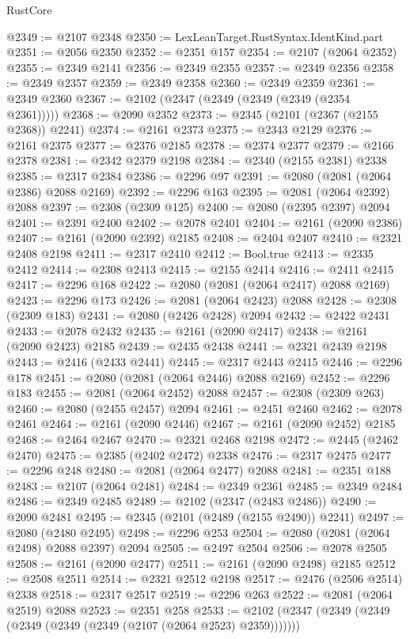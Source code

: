 \begin{lexlean}{RustCore}
\begin{coremodule}
@2349 := @2107 @2348
@2350 := LexLeanTarget.RustSyntax.IdentKind.part
@2351 := @2056 @2350
@2352 := @2351 @157
@2354 := @2107 (@2064 @2352)
@2355 := @2349 @2141
@2356 := @2349 @2355
@2357 := @2349 @2356
@2358 := @2349 @2357
@2359 := @2349 @2358
@2360 := @2349 @2359
@2361 := @2349 @2360
@2367 := @2102 (@2347 (@2349 (@2349 (@2349 (@2354 @2361)))))
@2368 := @2090 @2352
@2373 := @2345 (@2101 (@2367 (@2155 @2368)) @2241)
@2374 := @2161 @2373
@2375 := @2343 @2129
@2376 := @2161 @2375
@2377 := @2376 @2185
@2378 := @2374 @2377
@2379 := @2166 @2378
@2381 := @2342 @2379 @2198
@2384 := @2340 (@2155 @2381) @2338
@2385 := @2317 @2384
@2386 := @2296 @97
@2391 := @2080 (@2081 (@2064 @2386) @2088 @2169)
@2392 := @2296 @163
@2395 := @2081 (@2064 @2392) @2088
@2397 := @2308 (@2309 @125)
@2400 := @2080 (@2395 @2397) @2094
@2401 := @2391 @2400
@2402 := @2078 @2401
@2404 := @2161 (@2090 @2386)
@2407 := @2161 (@2090 @2392) @2185
@2408 := @2404 @2407
@2410 := @2321 @2408 @2198
@2411 := @2317 @2410
@2412 := Bool.true
@2413 := @2335 @2412
@2414 := @2308 @2413
@2415 := @2155 @2414
@2416 := @2411 @2415
@2417 := @2296 @168
@2422 := @2080 (@2081 (@2064 @2417) @2088 @2169)
@2423 := @2296 @173
@2426 := @2081 (@2064 @2423) @2088
@2428 := @2308 (@2309 @183)
@2431 := @2080 (@2426 @2428) @2094
@2432 := @2422 @2431
@2433 := @2078 @2432
@2435 := @2161 (@2090 @2417)
@2438 := @2161 (@2090 @2423) @2185
@2439 := @2435 @2438
@2441 := @2321 @2439 @2198
@2443 := @2416 (@2433 @2441)
@2445 := @2317 @2443 @2415
@2446 := @2296 @178
@2451 := @2080 (@2081 (@2064 @2446) @2088 @2169)
@2452 := @2296 @183
@2455 := @2081 (@2064 @2452) @2088
@2457 := @2308 (@2309 @263)
@2460 := @2080 (@2455 @2457) @2094
@2461 := @2451 @2460
@2462 := @2078 @2461
@2464 := @2161 (@2090 @2446)
@2467 := @2161 (@2090 @2452) @2185
@2468 := @2464 @2467
@2470 := @2321 @2468 @2198
@2472 := @2445 (@2462 @2470)
@2475 := @2385 (@2402 @2472) @2338
@2476 := @2317 @2475
@2477 := @2296 @248
@2480 := @2081 (@2064 @2477) @2088
@2481 := @2351 @188
@2483 := @2107 (@2064 @2481)
@2484 := @2349 @2361
@2485 := @2349 @2484
@2486 := @2349 @2485
@2489 := @2102 (@2347 (@2483 @2486))
@2490 := @2090 @2481
@2495 := @2345 (@2101 (@2489 (@2155 @2490)) @2241)
@2497 := @2080 (@2480 @2495)
@2498 := @2296 @253
@2504 := @2080 (@2081 (@2064 @2498) @2088 @2397) @2094
@2505 := @2497 @2504
@2506 := @2078 @2505
@2508 := @2161 (@2090 @2477)
@2511 := @2161 (@2090 @2498) @2185
@2512 := @2508 @2511
@2514 := @2321 @2512 @2198
@2517 := @2476 (@2506 @2514) @2338
@2518 := @2317 @2517
@2519 := @2296 @263
@2522 := @2081 (@2064 @2519) @2088
@2523 := @2351 @258
@2533 := @2102 (@2347 (@2349 (@2349 (@2349 (@2349 (@2349 (@2107 (@2064 @2523) @2359)))))))

\end{coremodule}
\end{lexlean}
